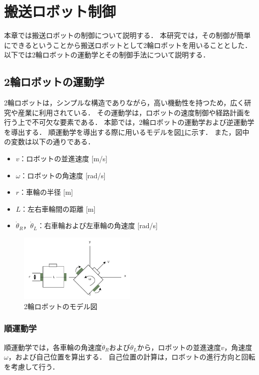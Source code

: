 
\section{搬送ロボット制御}
本章では搬送ロボットの制御について説明する．
本研究では，その制御が簡単にできるということから搬送ロボットとして2輪ロボットを用いることとした．
以下では2輪ロボットの運動学とその制御手法について説明する．

\subsection{2輪ロボットの運動学}
2輪ロボットは，シンプルな構造でありながら，高い機動性を持つため，広く研究や産業に利用されている．
その運動学は，ロボットの速度制御や経路計画を行う上で不可欠な要素である．
本節では，2輪ロボットの運動学および逆運動学を導出する．
順運動学を導出する際に用いるモデルを図\ref{fig:robot_model}に示す．
また，図中の変数は以下の通りである．

\begin{itemize}
    \item $v$：ロボットの並進速度 [m/s]
    \item $\omega$：ロボットの角速度 [rad/s]
    \item $r$：車輪の半径 [m]
    \item $L$：左右車輪間の距離 [m]
    \item $\dot{\theta}_R$，$\dot{\theta}_L$：右車輪および左車輪の角速度 [rad/s]
\end{itemize}

\begin{figure}[h]
    \centering
    \includegraphics[width=0.5\textwidth]{figure/robot_model.pdf}
    \caption{2輪ロボットのモデル図}
    \label{fig:robot_model}
\end{figure}


\subsubsection{順運動学}
順運動学では，各車輪の角速度$\dot{\theta}_R$および$\dot{\theta}_L$から，ロボットの並進速度$v$，角速度$\omega$，および自己位置を算出する．
自己位置の計算は，ロボットの進行方向と回転を考慮して行う．

